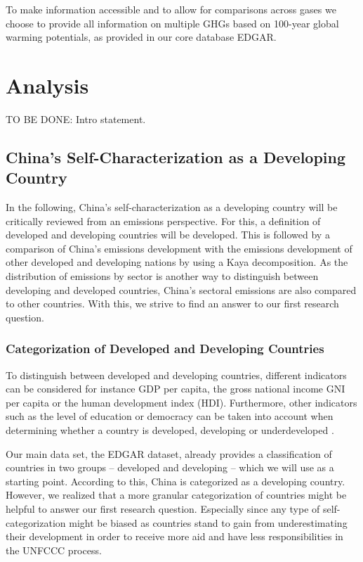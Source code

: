 \documentclass[
  12pt,
]{article}
\numberwithin{equation}{section}
\numberwithin{table}{section}
\numberwithin{figure}{section}
\begin{document}
To make information accessible and to allow for comparisons across gases
we choose to provide all information on multiple GHGs based on 100-year
global warming potentials, as provided in our core database EDGAR.

\hypertarget{analysis}{%
\section{Analysis}\label{analysis}}

TO BE DONE: Intro statement.

\hypertarget{chinas-self-characterization-as-a-developing-country}{%
\subsection{China's Self-Characterization as a Developing
Country}\label{chinas-self-characterization-as-a-developing-country}}

In the following, China's self-characterization as a developing country
will be critically reviewed from an emissions perspective. For this, a
definition of developed and developing countries will be developed. This
is followed by a comparison of China's emissions development with the
emissions development of other developed and developing nations by using
a Kaya decomposition. As the distribution of emissions by sector is
another way to distinguish between developing and developed countries,
China's sectoral emissions are also compared to other countries. With
this, we strive to find an answer to our first research question.

\hypertarget{categorization-of-developed-and-developing-countries}{%
\subsubsection{Categorization of Developed and Developing
Countries}\label{categorization-of-developed-and-developing-countries}}

To distinguish between developed and developing countries, different
indicators can be considered for instance GDP per capita, the gross
national income GNI per capita or the human development index (HDI).
Furthermore, other indicators such as the level of education or
democracy can be taken into account when determining whether a country
is developed, developing or underdeveloped \citep{Kinnunen2019}.

Our main data set, the EDGAR dataset, already provides a classification
of countries in two groups -- developed and developing -- which we will
use as a starting point. According to this, China is categorized as a
developing country. However, we realized that a more granular
categorization of countries might be helpful to answer our first
research question. Especially since any type of self-categorization
might be biased as countries stand to gain from underestimating their
development in order to receive more aid and have less responsibilities
in the UNFCCC process.
\end{document}
